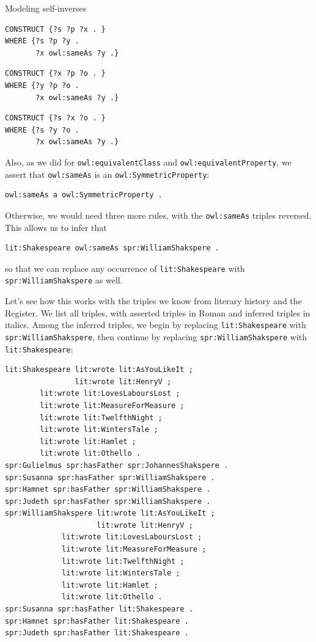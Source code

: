 \begin{challenge}{Modeling self-inverses}
\begin{lstlisting}
CONSTRUCT {?s ?p ?x . }
WHERE {?s ?p ?y .
       ?x owl:sameAs ?y .}
\end{lstlisting}

\begin{lstlisting}
CONSTRUCT {?x ?p ?o . }
WHERE {?y ?p ?o .
       ?x owl:sameAs ?y .} 
\end{lstlisting}

\begin{lstlisting}
CONSTRUCT {?s ?x ?o . }
WHERE {?s ?y ?o .
       ?x owl:sameAs ?y .}
\end{lstlisting}

Also, as we did for \texttt{owl:equivalentClass} and \texttt{owl:equivalentProperty}, we
assert that \texttt{owl:sameAs} is an \texttt{owl:SymmetricProperty}:

\begin{lstlisting}
owl:sameAs a owl:SymmetricProperty .
\end{lstlisting}

Otherwise, we would need three more rules, with the \texttt{owl:sameAs} triples
reversed. This allows us to infer that

\begin{lstlisting}
lit:Shakespeare owl:sameAs spr:WilliamShakspere .
\end{lstlisting}

so that we can replace any occurrence of \texttt{lit:Shakespeare} with
\texttt{spr:WilliamShakspere}
as well.

Let's see how this works with the triples we know from literary history
and the Register. We list all triples, with asserted triples in Roman
and inferred triples in italics. Among the inferred triples, we
begin by replacing \texttt{lit:Shakespeare} with \texttt{spr:WilliamShakspere}, then
continue by replacing \texttt{spr:WilliamShakspere} with \texttt{lit:Shakespeare}:

\begin{lstlisting}
lit:Shakespeare lit:wrote lit:AsYouLikeIt ;
                lit:wrote lit:HenryV ;
		lit:wrote lit:LovesLaboursLost ;
		lit:wrote lit:MeasureForMeasure ;
		lit:wrote lit:TwelfthNight ;
		lit:wrote lit:WintersTale ;
		lit:wrote lit:Hamlet ;
		lit:wrote lit:Othello .
spr:Gulielmus spr:hasFather spr:JohannesShakspere .
spr:Susanna spr:hasFather spr:WilliamShakspere .
spr:Hamnet spr:hasFather spr:WilliamShakspere .
spr:Judeth spr:hasFather spr:WilliamShakspere .
spr:WilliamShakspere lit:wrote lit:AsYouLikeIt ;  
                     lit:wrote lit:HenryV ;
		     lit:wrote lit:LovesLaboursLost ;
		     lit:wrote lit:MeasureForMeasure ;
		     lit:wrote lit:TwelfthNight ;
		     lit:wrote lit:WintersTale ;
		     lit:wrote lit:Hamlet ;
		     lit:wrote lit:Othello .
spr:Susanna spr:hasFather lit:Shakespeare .
spr:Hamnet spr:hasFather lit:Shakespeare .
spr:Judeth spr:hasFather lit:Shakespeare .
\end{lstlisting}


\end{challenge}
